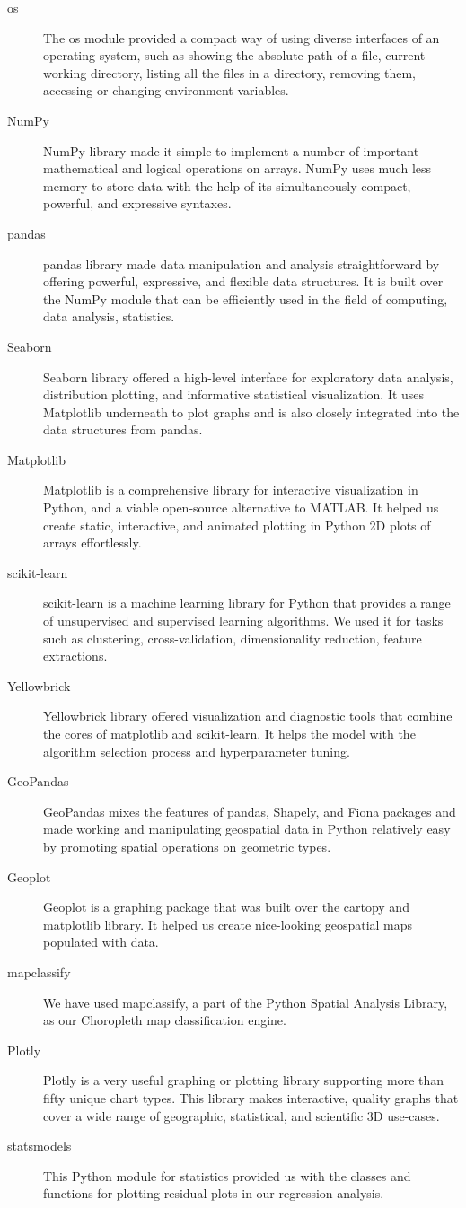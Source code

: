 \documentclass{swfuthesise}
\begin{document}
\begin{description}
\item[os] The os module provided a compact way of using diverse interfaces of an operating
  system, such as showing the absolute path of a file, current working directory, listing
  all the files in a directory, removing them, accessing or changing environment
  variables.
\item[NumPy] NumPy library made it simple to implement a number of important mathematical
  and logical operations on arrays. NumPy uses much less memory to store data with the
  help of its simultaneously compact, powerful, and expressive syntaxes.
\item[pandas] pandas library made data manipulation and analysis straightforward by
  offering powerful, expressive, and flexible data structures. It is built over the NumPy
  module that can be efficiently used in the field of computing, data analysis,
  statistics.
\item[Seaborn] Seaborn library offered a high-level interface for exploratory data
  analysis, distribution plotting, and informative statistical visualization. It uses
  Matplotlib underneath to plot graphs and is also closely integrated into the data
  structures from pandas.
\item[Matplotlib] Matplotlib is a comprehensive library for interactive visualization in
  Python, and a viable open-source alternative to MATLAB. It helped us create static,
  interactive, and animated plotting in Python 2D plots of arrays effortlessly.
\item[scikit-learn] scikit-learn is a machine learning library for Python that provides a
  range of unsupervised and supervised learning algorithms. We used it for tasks such as
  clustering, cross-validation, dimensionality reduction, feature extractions.
\item[Yellowbrick] Yellowbrick library offered visualization and diagnostic tools that
  combine the cores of matplotlib and scikit-learn. It helps the model with the algorithm
  selection process and hyperparameter tuning.
\item[GeoPandas] GeoPandas mixes the features of pandas, Shapely, and Fiona packages and
  made working and manipulating geospatial data in Python relatively easy by promoting
  spatial operations on geometric types.
\item[Geoplot] Geoplot is a graphing package that was built over the cartopy and
  matplotlib library. It helped us create nice-looking geospatial maps populated with
  data.
\item[mapclassify] We have used mapclassify, a part of the Python Spatial Analysis Library, as our Choropleth map classification engine. 
\item[Plotly] Plotly is a very useful graphing or plotting library supporting more than
  fifty unique chart types. This library makes interactive, quality graphs that cover a
  wide range of geographic, statistical, and scientific 3D use-cases.
\item[statsmodels] This Python module for statistics provided us with the classes and functions for plotting residual plots in our regression analysis.  
\end{description}
\end{document}
